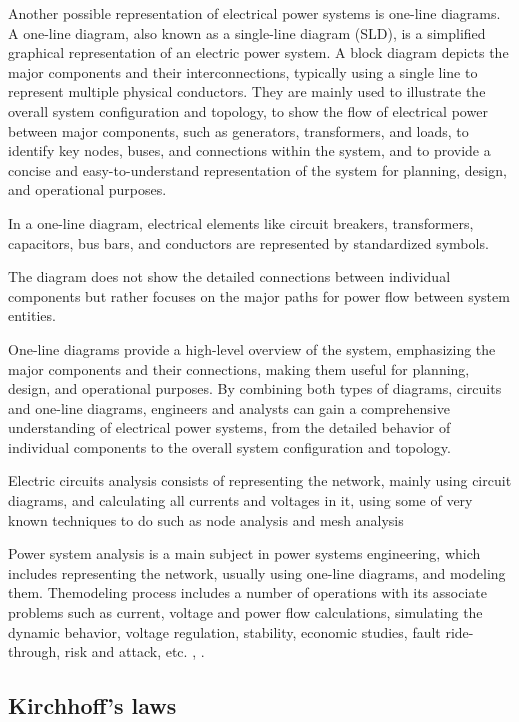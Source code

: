 \documentclass[11pt, a4paper]{article}
\theoremstyle{definition}
\theoremstyle{plain}
\theoremstyle{plain}
\theoremstyle{remark}
\theoremstyle{remark}
\theoremstyle{remark}
\begin{document}
Another possible representation of electrical power systems is one-line diagrams. A one-line diagram, also known as a single-line diagram (SLD), is a simplified graphical representation of an electric power system. A block diagram depicts the major components and their interconnections, typically using a single line to represent multiple physical conductors. They are mainly used to illustrate the overall system configuration and topology, to show the flow of electrical power between major components, such as generators, transformers, and loads, to identify key nodes, buses, and connections within the system, and to provide a concise and easy-to-understand representation of the system for planning, design, and operational purposes.

In a one-line diagram, electrical elements like circuit breakers, transformers, capacitors, bus bars, and conductors are represented by standardized symbols.

The diagram does not show the detailed connections between individual components but rather focuses on the major paths for power flow between system entities.

One-line diagrams provide a high-level overview of the system, emphasizing the major components and their connections, making them useful for planning, design, and operational purposes. By combining both types of diagrams, circuits and one-line diagrams, engineers and analysts can gain a comprehensive understanding of electrical power systems, from the detailed behavior of individual components to the overall system configuration and topology.

Electric circuits analysis consists of representing the network, mainly using circuit diagrams, and calculating all currents and voltages in it, using some of very known techniques to do such as node analysis and mesh analysis

Power system analysis is a main subject in power systems engineering, which includes representing the network, usually using one-line diagrams, and modeling them.  Themodeling process includes a number of operations with its associate problems such as current, voltage and power flow calculations, simulating the dynamic behavior, voltage regulation, stability, economic studies, fault ride-through, risk and attack, etc. \cite{Grainger1994}, \cite{Nagsarkar2007}.

\subsection{Kirchhoff’s laws}
\end{document}

